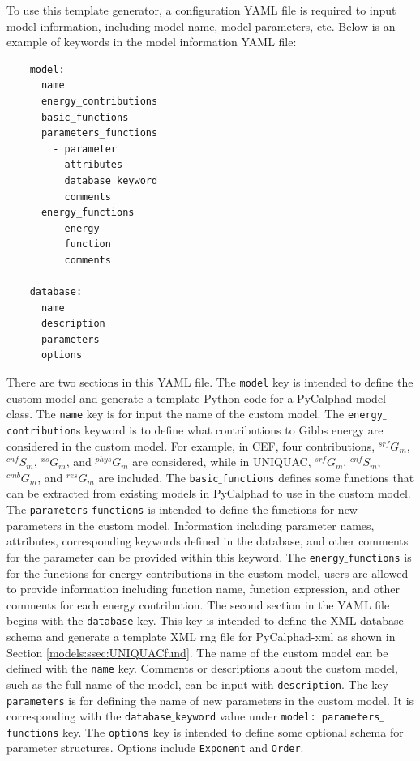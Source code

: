 To use this template generator, a configuration YAML file is required to input model information, including model name, model parameters, etc. Below is an example of keywords in the model information YAML file:
\begin{verbatim}
    model:
      name
      energy_contributions
      basic_functions
      parameters_functions
        - parameter
          attributes
          database_keyword
          comments
      energy_functions
        - energy
          function
          comments

    database:
      name
      description
      parameters
      options
\end{verbatim}
There are two sections in this YAML file. The \texttt{model} key is intended to define the custom model and generate a template Python code for a PyCalphad model class. The \texttt{name} key is for input the name of the custom model. The \texttt{energy$\_$contribution}s keyword is to define what contributions to Gibbs energy are considered in the custom model. For example, in CEF, four contributions, $^{srf}G_m$, $^{cnf}S_m$, $^{xs}G_m$, and $^{phys}G_m$ are considered, while in UNIQUAC, $^{srf}G_m$, $^{cnf}S_m$, $^{cmb}G_m$, and $^{res}G_m$ are included. The \texttt{basic$\_$functions} defines some functions that can be extracted from existing models in PyCalphad to use in the custom model. The \texttt{parameters$\_$functions} is intended to define the functions for new parameters in the custom model. Information including parameter names, attributes, corresponding keywords defined in the database, and other comments for the parameter can be provided within this keyword. The \texttt{energy$\_$functions} is for the functions for energy contributions in the custom model, users are allowed to provide information including function name, function expression, and other comments for each energy contribution. The second section in the YAML file begins with the \texttt{database} key. This key is intended to define the XML database schema and generate a template XML rng file for PyCalphad-xml as shown in Section \ref{models:ssec:UNIQUACfund}. The name of the custom model can be defined with the \texttt{name} key. Comments or descriptions about the custom model, such as the full name of the model, can be input with \texttt{description}. The key \texttt{parameters} is for defining the name of new parameters in the custom model. It is corresponding with the \texttt{database$\_$keyword} value under \texttt{model: parameters$\_$functions} key. The \texttt{options} key is intended to define some optional schema for parameter structures. Options include \texttt{Exponent} and \texttt{Order}.

